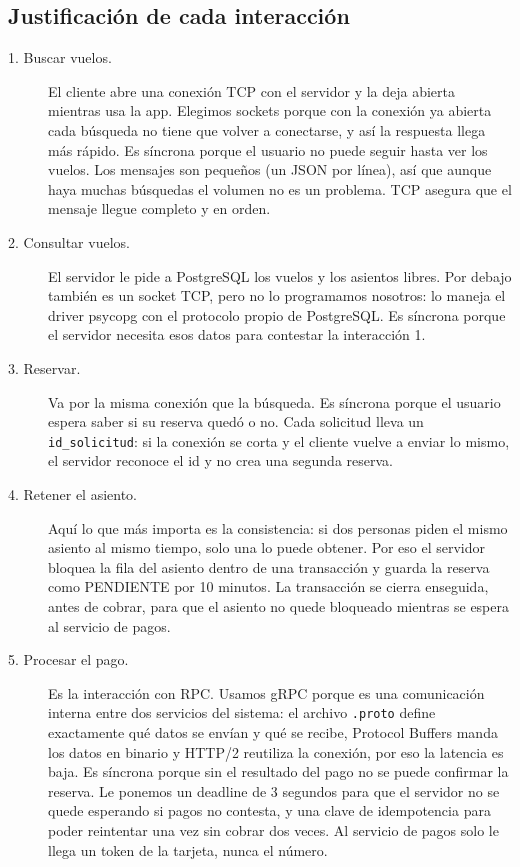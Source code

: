 \subsection{Justificación de cada interacción}

\begin{description}
  \item[1. Buscar vuelos.] El cliente abre una conexión TCP con el servidor y la deja abierta mientras usa la app. Elegimos sockets porque con la conexión ya abierta cada búsqueda no tiene que volver a conectarse, y así la respuesta llega más rápido. Es síncrona porque el usuario no puede seguir hasta ver los vuelos. Los mensajes son pequeños (un JSON por línea), así que aunque haya muchas búsquedas el volumen no es un problema. TCP asegura que el mensaje llegue completo y en orden.

  \item[2. Consultar vuelos.] El servidor le pide a PostgreSQL los vuelos y los asientos libres. Por debajo también es un socket TCP, pero no lo programamos nosotros: lo maneja el driver psycopg con el protocolo propio de PostgreSQL. Es síncrona porque el servidor necesita esos datos para contestar la interacción 1.

  \item[3. Reservar.] Va por la misma conexión que la búsqueda. Es síncrona porque el usuario espera saber si su reserva quedó o no. Cada solicitud lleva un \texttt{id\_solicitud}: si la conexión se corta y el cliente vuelve a enviar lo mismo, el servidor reconoce el id y no crea una segunda reserva.

  \item[4. Retener el asiento.] Aquí lo que más importa es la consistencia: si dos personas piden el mismo asiento al mismo tiempo, solo una lo puede obtener. Por eso el servidor bloquea la fila del asiento dentro de una transacción y guarda la reserva como PENDIENTE por 10 minutos. La transacción se cierra enseguida, antes de cobrar, para que el asiento no quede bloqueado mientras se espera al servicio de pagos.

  \item[5. Procesar el pago.] Es la interacción con RPC. Usamos gRPC porque es una comunicación interna entre dos servicios del sistema: el archivo \texttt{.proto} define exactamente qué datos se envían y qué se recibe, Protocol Buffers manda los datos en binario y HTTP/2 reutiliza la conexión, por eso la latencia es baja. Es síncrona porque sin el resultado del pago no se puede confirmar la reserva. Le ponemos un deadline de 3 segundos para que el servidor no se quede esperando si pagos no contesta, y una clave de idempotencia para poder reintentar una vez sin cobrar dos veces. Al servicio de pagos solo le llega un token de la tarjeta, nunca el número.


\end{description}
